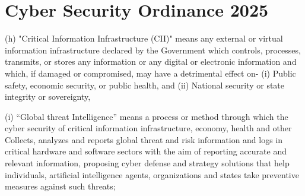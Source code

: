 \chapter{Cyber Security Ordinance 2025}

(h) "Critical Information Infrastructure (CII)" means any external or virtual information infrastructure declared by the Government which controls, processes, transmits, or stores any information or any digital or electronic information and which, if damaged or compromised,
may have a detrimental effect on-
(i) Public safety, economic security, or public health, and
(ii) National security or state integrity or sovereignty,




(i) “Global threat Intelligence” means a process or method through which the cyber security
of critical information infrastructure, economy, health and other Collects, analyzes and reports
global threat and risk information and logs in critical hardware and software sectors with the
aim of reporting accurate and relevant information, proposing cyber defense and strategy
solutions that help individuals, artificial intelligence agents, organizations and states take
preventive measures against such threats;



